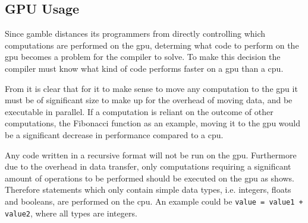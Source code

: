\subsection*{GPU Usage}\label{GPUCode}
Since \gls{gamble} distances its programmers from directly controlling which computations are performed on the \acrshort{gpu}, determing what code to perform on the \acrshort{gpu} becomes a problem for the compiler to solve.
To make this decision the compiler must know what kind of code performs faster on a \acrshort{gpu} than a \acrshort{cpu}.

From  it is clear that for it to make sense to move any computation to the \acrshort{gpu} it must be of significant size to make up for the overhead of moving data, and be executable in parallel.
If a computation is reliant on the outcome of other computations, the Fibonacci function as an example, moving it to the \acrshort{gpu} would be a significant decrease in performance compared to a \acrshort{cpu}.

Any code written in a recursive format will not be run on the \acrshort{gpu}. 
Furthermore due to the overhead in data transfer, only computations requiring a significant amount of operations to be performed should be executed on the \acrshort{gpu} as  shows.
Therefore statements which only contain simple data types, i.e. integers, floats and booleans, are performed on the \acrshort{cpu}.
An example could be \texttt{value = value1 + value2}, where all types are integers.

